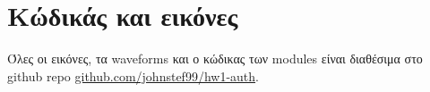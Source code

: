 \documentclass[12pt]{article}
\begin{document}


\maketitle \newpage
{}
\tableofcontents \newpage






\section*{Κώδικάς και εικόνες}
Όλες οι εικόνες, τα waveforms και ο κώδικας των modules είναι διαθέσιμα στο
github repo
\href{https://github.com/johnstef99/hw1-auth}{github.com/johnstef99/hw1-auth}.
\end{document}
